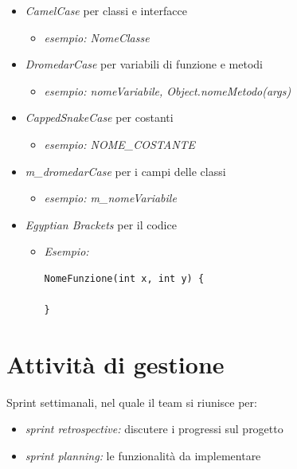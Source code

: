 \documentclass[12pt]{article}
\begin{document}
\begin{itemize}
	\item \emph{CamelCase} per classi e interfacce
	\begin{itemize}
		\item \emph{esempio: NomeClasse}
	\end{itemize}

        \item \emph{DromedarCase} per variabili di funzione e metodi
        \begin{itemize}
                \item \emph{esempio: nomeVariabile, Object.nomeMetodo(args)}
        \end{itemize}

        \item \emph{CappedSnakeCase} per costanti
        \begin{itemize}
                \item \emph{esempio: NOME\_COSTANTE}
        \end{itemize}

        \item \emph{m\_dromedarCase} per i campi delle classi
        \begin{itemize}
                \item \emph{esempio: m\_nomeVariabile}
        \end{itemize}

        \item \emph{Egyptian Brackets} per il codice
        \begin{itemize}
                \item \emph{Esempio:}
		\begin{verbatim}
NomeFunzione(int x, int y) {

}
		\end{verbatim}
        \end{itemize}
\end{itemize}

\section{Attività di gestione}

Sprint settimanali, nel quale il team si riunisce per:
\begin{itemize}
	\item \emph{sprint retrospective:} discutere i progressi sul progetto
	\item \emph{sprint planning:} le funzionalità da implementare
\end{itemize}
\end{document}
